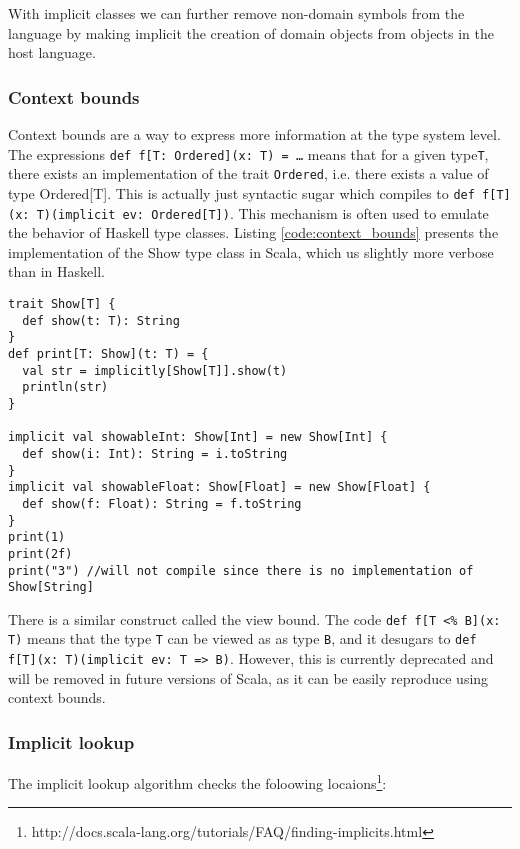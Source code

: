 With implicit classes we can further remove non-domain symbols from the language by making implicit the creation of domain objects from objects in the host language.

\subsubsection{Context bounds}
Context bounds are a way to express more information at the type system level.
The expressions \texttt{def f[T: Ordered](x: T) = \ldots} means that for a given type\texttt{T}, there exists an implementation of the trait \texttt{Ordered}, i.e. there exists a value of type Ordered[T].
This is actually just syntactic sugar which compiles to \texttt{def f[T](x: T)(implicit ev: Ordered[T])}.
This mechanism is often used to emulate the behavior of Haskell type classes.
Listing \ref{code:context_bounds} presents the implementation of the Show type class in Scala, which us slightly more verbose than in Haskell.

\begin{lstlisting}[caption=Context bounds, label=code:context_bounds, float]
trait Show[T] {
  def show(t: T): String
}
def print[T: Show](t: T) = {
  val str = implicitly[Show[T]].show(t)
  println(str)
}

implicit val showableInt: Show[Int] = new Show[Int] {
  def show(i: Int): String = i.toString
}
implicit val showableFloat: Show[Float] = new Show[Float] {
  def show(f: Float): String = f.toString
}
print(1)
print(2f)
print("3") //will not compile since there is no implementation of Show[String]
\end{lstlisting}

There is a similar construct called the view bound.
The code \texttt{def f[T <\% B](x: T)} means that the type \texttt{T} can be viewed as as type \texttt{B}, and it desugars to \texttt{def f[T](x: T)(implicit ev: T => B)}.
However, this is currently deprecated and will be removed in future versions of Scala, as it can be easily reproduce using context bounds.

\subsubsection{Implicit lookup}

The implicit lookup algorithm checks the foloowing locaions\footnote{http://docs.scala-lang.org/tutorials/FAQ/finding-implicits.html}: 

